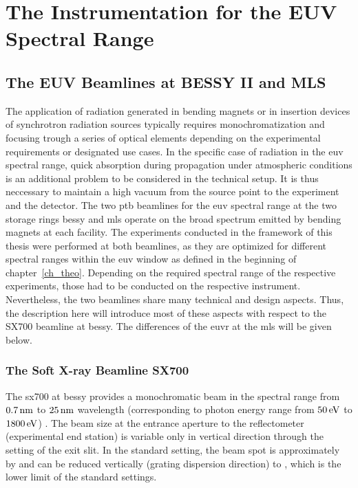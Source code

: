\section{The Instrumentation for the EUV Spectral Range}
\subsection{The EUV Beamlines at BESSY II and MLS}
The application of radiation generated in bending magnets or in insertion devices of synchrotron radiation sources typically requires monochromatization and focusing trough a series of optical elements depending on the experimental requirements or designated use cases. In the specific case of radiation in the \gls{euv} spectral range, quick absorption during propagation under atmospheric conditions is an additional problem to be considered in the technical setup. It is thus neccessary to maintain a high vacuum from the source point to the experiment and the detector. The two \gls{ptb} beamlines for the \gls{euv} spectral range at the two storage rings \gls{bessy} and \gls{mls} operate on the broad spectrum emitted by bending magnets at each facility. The experiments conducted in the framework of this thesis were performed at both beamlines, as they are optimized for different spectral ranges within the \gls{euv} window as defined in the beginning of chapter~\ref{ch_theo}.  Depending on the required spectral range of the respective experiments, those had to be conducted on the respective instrument. Nevertheless, the two beamlines share many technical and design aspects. Thus, the description here will introduce most of these aspects with respect to the SX700 beamline at \gls{bessy}. The differences of the \gls{euvr} at the \gls{mls} will be given below.

\subsubsection{The Soft X-ray Beamline SX700}
The \gls{sx700} at \gls{bessy} provides a monochromatic beam in the spectral range from $\nm{0.7}$ to $\nm{25}$ wavelength (corresponding to photon energy range from $\ev{50}$ to $\ev{1800}$) \cite{beckhoff_quarter-century_2009}. The beam size at the entrance aperture to the reflectometer (experimental end station) is variable only in vertical direction through the setting of the exit slit. In the standard setting, the beam spot is approximately  by  \cite{scholze_high-accuracy_2001} and can be reduced vertically (grating dispersion direction) to , which is the lower limit of the standard settings.

